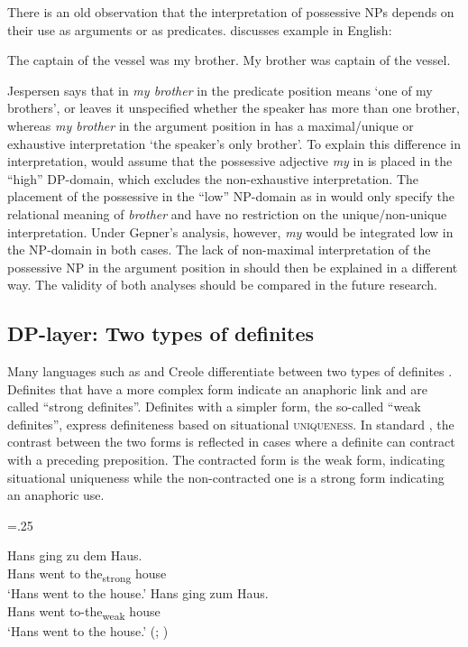 \documentclass[output=paper]{langscibook}
\begin{document}
There is an old observation that the interpretation of possessive NPs depends on their use as arguments or as predicates. \citet{Jespersen1965} discusses example  in English:

\ea \label{ex:6} \ea The captain of the vessel was my brother. \label{ex:6a}
\ex My brother was captain of the vessel.\label{ex:6b}
\z \z

\noindent Jespersen says that in  \textit{my brother} in the predicate position means `one of my brothers', or leaves it unspecified whether the speaker has more than one brother, whereas \textit{my brother} in the argument position in  has a maximal\slash unique or exhaustive interpretation `the speaker’s only brother'. To explain this difference in interpretation, \citet{Kagan.Pereltsvaig2014} would assume that the possessive adjective \textit{my} in  is placed in the ``high'' DP-domain, which excludes the non-ex\-haustive interpretation. The placement of the possessive in the ``low'' NP-domain as in  would only specify the relational meaning of \textit{brother} and have no restriction on the unique/non-unique interpretation. Under Gepner's analysis, however, \textit{my} would be integrated low in the NP-domain in both cases. The lack of non-maximal interpretation of the possessive NP in the argument position in  should then be explained in a different way. The validity of both analyses should be compared in the future research.

\subsection{DP-layer: Two types of definites}

Many languages such as  and  Creole differentiate between two types of definites \citep{Lobner2011,Schwarz2009,Schwarz2013,Jenks2015}. Definites that have a more complex form indicate an anaphoric link and are called ``strong definites''. Definites with a simpler form, the so-called ``weak definites'', express definiteness based on situational \textsc{uniqueness}. In standard , the contrast between the two forms is reflected in cases where a definite can contract with a preceding preposition. The contracted form is the weak form, indicating situational uniqueness while the non-contracted one is a strong form indicating an anaphoric use.


\ea \label{ex:7}
\multicolsep=.25\baselineskip
\begin{multicols}{2}\raggedcolumns
\ea
\gll Hans ging zu dem Haus. \\
    Hans went to the\textsubscript{strong} house\\ %
\glt `Hans went to the house.' \label{ex:7a}
\columnbreak\ex \gll Hans ging zum Haus. \\
 Hans went to-the\textsubscript{weak} house\\ %
\glt `Hans went to the house.' \hfill (; \citealt[12]{Schwarz2009}) \label{ex:7b}
\z \end{multicols}\z
\end{document}
